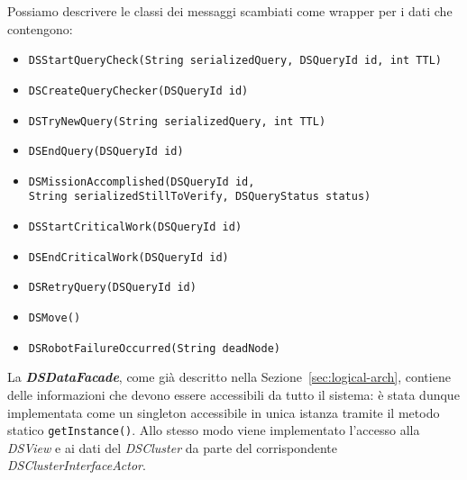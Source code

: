 Possiamo descrivere le classi dei messaggi scambiati come
wrapper per i dati che contengono:
\begin{itemize}
\item \texttt{DSStartQueryCheck(String serializedQuery,
  DSQueryId id, int TTL)}
\item \texttt{DSCreateQueryChecker(DSQueryId id)}
\item \texttt{DSTryNewQuery(String serializedQuery, int TTL)}
\item \texttt{DSEndQuery(DSQueryId id)}
\item \texttt{DSMissionAccomplished(DSQueryId id,\\
  \phantom{....}
  String serializedStillToVerify, DSQueryStatus status)}
\item \texttt{DSStartCriticalWork(DSQueryId id)}
\item \texttt{DSEndCriticalWork(DSQueryId id)}
\item \texttt{DSRetryQuery(DSQueryId id)}
\item \texttt{DSMove()}
\item \texttt{DSRobotFailureOccurred(String deadNode)}
\end{itemize}

La \textbf{\emph{DSDataFacade}}, come già descritto nella
Sezione~\ref{sec:logical-arch}, contiene delle informazioni che devono
essere accessibili da tutto il sistema: è stata dunque implementata
come un singleton accessibile in unica istanza tramite il metodo statico
\texttt{getInstance()}.
Allo stesso modo viene implementato l'accesso alla \emph{DSView} e
ai dati del \emph{DSCluster} da parte del corrispondente
\emph{DSClusterInterfaceActor}.\\

